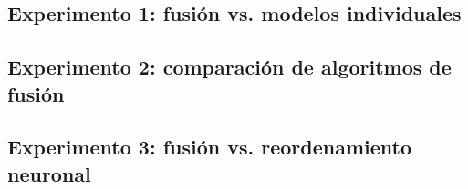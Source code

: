 
\subsection{Experimento 1: fusión vs. modelos individuales}\label{subsec:metodologia-e1}

\subsection{Experimento 2: comparación de algoritmos de fusión}\label{subsec:metodologia-e2}

\subsection{Experimento 3: fusión vs. reordenamiento neuronal}\label{subsec:metodologia-e3}

